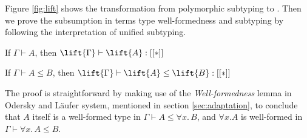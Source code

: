 Figure \ref{fig:lift} shows the transformation from polymorphic subtyping to \name.
Then we prove the subsumption in terms type well-formedness and subtyping
by following the interpretation of unified subtyping.

\begin{theorem}
    If $\Gamma \vdash A$, then $\lift{\Gamma} \vdash \lift{A} : [[*]]$
\end{theorem}

\begin{theorem}
    If $\Gamma \vdash A \le B$, then $\lift{\Gamma} \vdash \lift{A} \le \lift{B} : [[*]]$
\end{theorem}

The proof is straightforward by making use of the \emph{Well-formedness} lemma
in Odersky and L\"aufer system, mentioned in section \ref{sec:adaptation}, to conclude that
$A$ itself is a well-formed type in $\Gamma \vdash A \le \forall x.\, B$, and
$\forall x. A$ is well-formed in $\Gamma \vdash \forall x. \, A \le B$.


